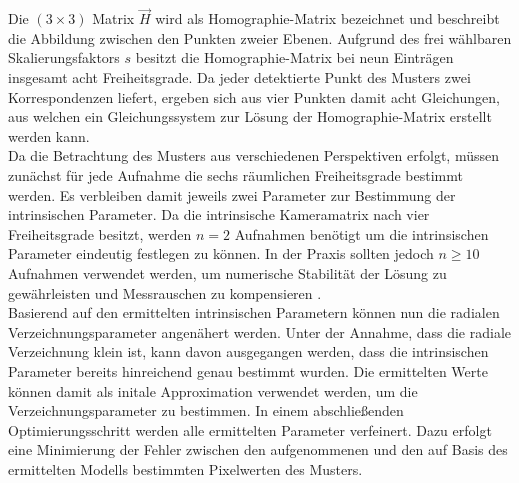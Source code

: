 

Die $(3 \times 3)$ Matrix $\vec{H}$ wird als Homographie-Matrix bezeichnet und beschreibt die Abbildung zwischen den Punkten zweier Ebenen. Aufgrund des frei wählbaren Skalierungsfaktors $s$ besitzt die Homographie-Matrix bei neun Einträgen insgesamt acht Freiheitsgrade. Da jeder detektierte Punkt des Musters zwei Korrespondenzen liefert, ergeben sich aus vier Punkten damit acht Gleichungen, aus welchen ein Gleichungssystem zur Lösung der Homographie-Matrix erstellt werden kann.\\

Da die Betrachtung des Musters aus verschiedenen Perspektiven erfolgt, müssen zunächst für jede Aufnahme die sechs räumlichen Freiheitsgrade bestimmt werden. Es verbleiben damit jeweils zwei Parameter zur Bestimmung der intrinsischen Parameter. Da die intrinsische Kameramatrix nach  vier Freiheitsgrade besitzt, werden $n = 2$ Aufnahmen benötigt um die intrinsischen Parameter eindeutig festlegen zu können. In der Praxis sollten jedoch $n \geq 10$ Aufnahmen verwendet werden, um numerische Stabilität der Lösung zu gewährleisten und Messrauschen zu kompensieren \cite{Bradsky2008}.\\


Basierend auf den ermittelten intrinsischen Parametern können nun die radialen Verzeichnungsparameter angenähert werden. Unter der Annahme, dass die radiale Verzeichnung klein ist, kann davon ausgegangen werden, dass die intrinsischen Parameter bereits hinreichend genau bestimmt wurden. Die ermittelten Werte können damit als initale Approximation verwendet werden, um die Verzeichnungsparameter zu bestimmen. In einem abschließenden Optimierungsschritt werden alle ermittelten Parameter verfeinert. Dazu erfolgt eine Minimierung der Fehler zwischen den aufgenommenen und den auf Basis des ermittelten Modells bestimmten Pixelwerten des Musters.

